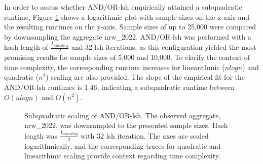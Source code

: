In order to assess whether AND/OR-\acrshort{lsh} empirically attained a subquadratic runtime, Figure \ref{fig:subquadratic_scaling} shows a logarithmic plot with sample sizes on the x-axis and the resulting runtimes on the y-axis. Sample sizes of up to 25,000 were compared by downsampling the aggregate nrw\_2022. AND/OR-\acrshort{lsh} was performed with a hash length of $\frac{L_{encoding}}{2}$ and 32 \acrshort{lsh} iterations, as this configuration yielded the most promising results for sample sizes of 5,000 and 10,000. To clarify the context of time complexity, the corresponding runtime increases for linearithmic ($nlogn$) and quadratic ($n^2$) scaling are also provided. The slope of the empirical fit for the AND/OR-\acrshort{lsh} runtimes is 1.46, indicating a subquadratic runtime between $O(nlogn)$ and $O(n^2)$.

\begin{figure}[H]
  \centering
    
    \caption[Subquadratic scaling of AND/OR-\acrshort{lsh}]{Subquadratic scaling of AND/OR-\acrshort{lsh}. The observed aggregate, nrw\_2022, was downsampled to the presented sample sizes. Hash length was $\frac{L_{encoding}}{2}$ with 32 \acrshort{lsh} iteration. The axes are scaled logarithmically, and the corresponding traces for quadratic and linearithmic scaling provide context regarding time complexity.}
  \label{fig:subquadratic_scaling}
\end{figure}

